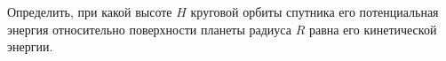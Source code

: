 Определить, при какой высоте $H$ круговой орбиты спутника его
потенциальная энергия относительно поверхности планеты радиуса $R$ равна
его кинетической энергии.
